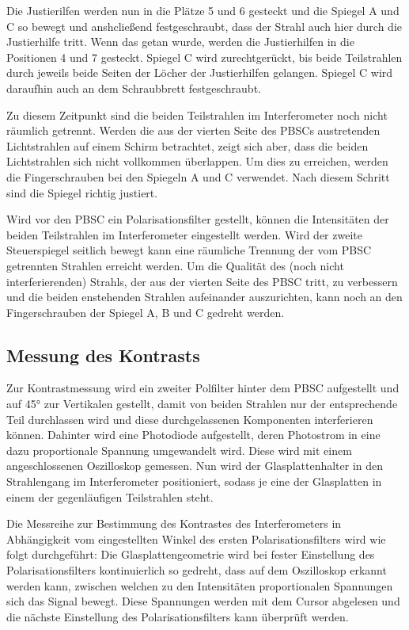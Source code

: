 Die Justierilfen werden nun in die Plätze 5 und 6 gesteckt und die Spiegel A und C so bewegt und anshcließend festgeschraubt, dass der Strahl auch hier durch die Justierhilfe tritt. Wenn das getan wurde, werden die Justierhilfen in die Positionen 4 und 7 gesteckt. Spiegel C wird zurechtgerückt, bis beide Teilstrahlen durch jeweils beide Seiten der Löcher der Justierhilfen gelangen. Spiegel C wird daraufhin auch an dem Schraubbrett festgeschraubt.

Zu diesem Zeitpunkt sind die beiden Teilstrahlen im Interferometer noch nicht räumlich getrennt. Werden die aus der vierten Seite des PBSCs austretenden Lichtstrahlen auf einem Schirm betrachtet, zeigt
sich aber, dass die beiden Lichtstrahlen sich nicht vollkommen überlappen. Um dies zu erreichen, werden die Fingerschrauben bei den Spiegeln A und C verwendet. Nach diesem Schritt sind die Spiegel
richtig justiert.

Wird vor den PBSC ein Polarisationsfilter gestellt, können die Intensitäten der beiden Teilstrahlen im Interferometer eingestellt werden. Wird der zweite Steuerspiegel seitlich bewegt kann eine räumliche Trennung der vom PBSC getrennten Strahlen erreicht werden. Um die Qualität des (noch nicht interferierenden) Strahls, der aus der vierten Seite des PBSC tritt, zu verbessern und die beiden enstehenden Strahlen aufeinander auszurichten, kann noch an den Fingerschrauben der Spiegel A, B und C gedreht werden.

\subsection{Messung des Kontrasts}
Zur Kontrastmessung wird ein zweiter Polfilter hinter dem PBSC aufgestellt und auf 45° zur Vertikalen gestellt, damit von beiden Strahlen nur der entsprechende Teil durchlassen wird und diese durchgelassenen Komponenten interferieren können. Dahinter wird eine Photodiode aufgestellt, deren Photostrom in eine dazu proportionale Spannung umgewandelt wird. Diese wird mit einem angeschlossenen Oszilloskop gemessen. Nun wird der Glasplattenhalter in den Strahlengang im Interferometer positioniert, sodass je eine der Glasplatten in einem der gegenläufigen Teilstrahlen steht.

Die Messreihe zur Bestimmung des Kontrastes des Interferometers in Abhängigkeit vom eingestellten Winkel des ersten Polarisationsfilters wird wie folgt durchgeführt: Die Glasplattengeometrie wird bei fester Einstellung des Polarisationsfilters kontinuierlich so gedreht, dass auf dem Oszilloskop erkannt werden kann, zwischen welchen zu den Intensitäten proportionalen Spannungen sich das Signal bewegt. Diese Spannungen werden mit dem Cursor abgelesen und die nächste Einstellung des Polarisationsfilters kann überprüft werden.

